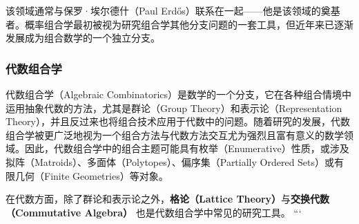 该领域通常与保罗·埃尔德什（Paul Erdős）联系在一起——他是该领域的奠基者。概率组合学最初被视为研究组合学其他分支问题的一套工具，但近年来已逐渐发展成为组合数学的一个独立分支。
\subsubsection{代数组合学}

代数组合学（Algebraic Combinatorics）是数学的一个分支，它在各种组合情境中运用抽象代数的方法，尤其是群论（Group Theory）和表示论（Representation Theory），并且反过来也将组合技术应用于代数中的问题。随着研究的发展，代数组合学被更广泛地视为一个组合方法与代数方法交互尤为强烈且富有意义的数学领域。因此，代数组合学中的组合主题可能具有枚举（Enumerative）性质，或涉及拟阵（Matroids）、多面体（Polytopes）、偏序集（Partially Ordered Sets）或有限几何（Finite Geometries）等对象。  

在代数方面，除了群论和表示论之外，\textbf{格论（Lattice Theory）}与\textbf{交换代数（Commutative Algebra）}  
也是代数组合学中常见的研究工具。
```





